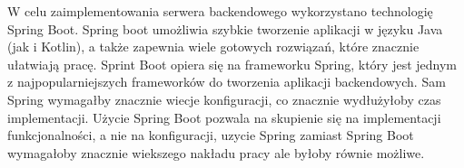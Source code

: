 W celu zaimplementowania serwera backendowego wykorzystano technologię Spring Boot.
Spring boot umożliwia szybkie tworzenie aplikacji w języku Java (jak i Kotlin), a także zapewnia wiele gotowych rozwiązań, które znacznie ułatwiają pracę.
Sprint Boot opiera się na frameworku Spring, który jest jednym z najpopularniejszych frameworków do tworzenia aplikacji backendowych.
Sam Spring wymagałby znacznie wiecje konfiguracji, co znacznie wydłużyłoby czas implementacji.
Użycie Spring Boot pozwala na skupienie się na implementacji funkcjonalności, a nie na konfiguracji,
uzycie Spring zamiast Spring Boot wymagałoby znacznie wiekszego nakładu pracy ale byłoby równie możliwe.

